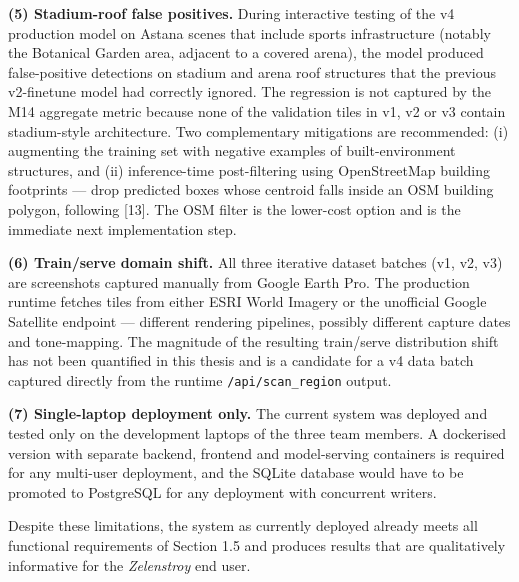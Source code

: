 \textbf{(5) Stadium-roof false positives.} During interactive testing of the v4 production model on Astana scenes that include sports infrastructure (notably the Botanical Garden area, adjacent to a covered arena), the model produced false-positive detections on stadium and arena roof structures that the previous v2-finetune model had correctly ignored. The regression is not captured by the M14 aggregate metric because none of the validation tiles in v1, v2 or v3 contain stadium-style architecture. Two complementary mitigations are recommended: (i) augmenting the training set with negative examples of built-environment structures, and (ii) inference-time post-filtering using OpenStreetMap building footprints --- drop predicted boxes whose centroid falls inside an OSM building polygon, following {[}13{]}. The OSM filter is the lower-cost option and is the immediate next implementation step.

\textbf{(6) Train/serve domain shift.} All three iterative dataset batches (v1, v2, v3) are screenshots captured manually from Google Earth Pro. The production runtime fetches tiles from either ESRI World Imagery or the unofficial Google Satellite endpoint --- different rendering pipelines, possibly different capture dates and tone-mapping. The magnitude of the resulting train/serve distribution shift has not been quantified in this thesis and is a candidate for a v4 data batch captured directly from the runtime \texttt{/api/scan\_region} output.

\textbf{(7) Single-laptop deployment only.} The current system was deployed and tested only on the development laptops of the three team members. A dockerised version with separate backend, frontend and model-serving containers is required for any multi-user deployment, and the SQLite database would have to be promoted to PostgreSQL for any deployment with concurrent writers.

Despite these limitations, the system as currently deployed already meets all functional requirements of Section 1.5 and produces results that are qualitatively informative for the \emph{Zelenstroy} end user.

\newpage
